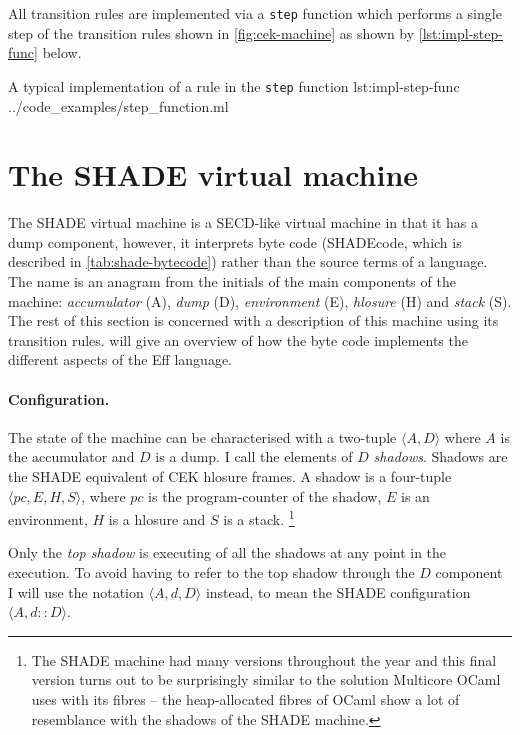 \documentclass[class=article, crop=false]{standalone}
\begin{document}
All transition rules are implemented via a \lstinline{step} function which performs a single step of the
transition rules shown in \autoref{fig:cek-machine} as shown by \autoref{lst:impl-step-func} below.

{A typical implementation of a rule in the \lstinline{step} function}
{lst:impl-step-func}
{../code_examples/step_function.ml}

\section{The SHADE virtual machine}
\label{sec:shade-machine}

The SHADE virtual machine is a SECD-like virtual machine in that it has a dump component,
however, it interprets byte code (SHADEcode, which is described in \autoref{tab:shade-bytecode})
rather than the source terms of a language. The name is an anagram from the initials of the
main components of the machine: 
\emph{accumulator} (A), \emph{dump} (D), \emph{environment} (E), \emph{hlosure} (H) and
\emph{stack} (S). The rest of this section is concerned with a
description of this machine using its transition rules.  will
give an overview of how the byte code implements the different aspects of the Eff language.

\paragraph{Configuration.}
The state of the machine can be characterised with a two-tuple $ \langle A, D \rangle $
where $A$ is the accumulator and $D$ is a dump. I call the elements of $D$ \emph{shadows}.
Shadows are the SHADE equivalent of CEK hlosure frames.
A shadow is a four-tuple $ \langle pc, E, H, S \rangle $, where $pc$ is the
program-counter of the shadow, $E$ is an environment, $H$ is a hlosure and $S$ is
a stack.
\footnote{The SHADE machine had many versions throughout the year and this final version
turns out to be surprisingly similar to the solution Multicore OCaml uses with its fibres
-- the heap-allocated fibres of OCaml show a lot of resemblance with the shadows of the
SHADE machine.}

Only the \emph{top shadow} is executing of all the shadows at any point in the execution.
To avoid having to refer to the top shadow through the $D$ component I will use the notation
$\langle A, d, D \rangle$ instead, to mean the SHADE configuration $\langle A, d :: D \rangle$.
\end{document}
